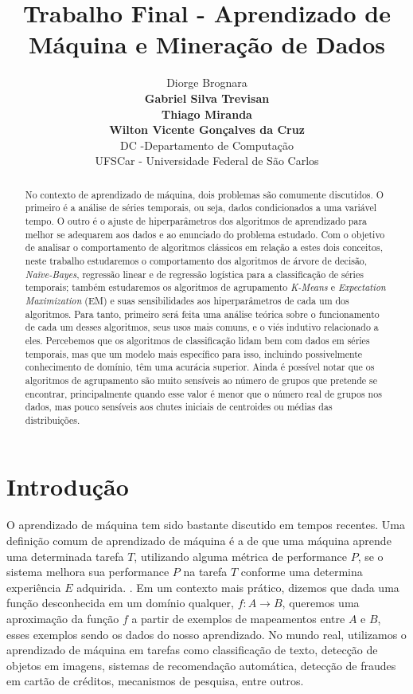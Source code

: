\documentclass{article}
\title{Trabalho Final - Aprendizado de Máquina e Mineração de Dados}
\author{
Diorge Brognara \\
{\bf Gabriel Silva Trevisan}  \\
{\bf Thiago Miranda} \\
{\bf Wilton Vicente Gonçalves da Cruz} \\
DC -Departamento de Computação \\
UFSCar - Universidade Federal de São Carlos \\
}
\begin{document}
\maketitle

\begin{abstract}
No contexto de aprendizado de máquina, dois problemas são comumente discutidos.
O primeiro é a análise de séries temporais, ou seja, dados condicionados a uma variável tempo.
O outro é o ajuste de hiperparâmetros dos algoritmos de aprendizado para melhor se adequarem aos dados e ao enunciado do problema estudado.
Com o objetivo de analisar o comportamento de algoritmos clássicos em relação a estes dois conceitos,
neste trabalho estudaremos o comportamento dos algoritmos de árvore de decisão, {\it Naïve-Bayes},
regressão linear e de regressão logística para a classificação de séries temporais;
também estudaremos os algoritmos de agrupamento {\it K-Means} e {\it Expectation Maximization} (EM)
e suas sensibilidades aos hiperparâmetros de cada um dos algoritmos.
Para tanto, primeiro será feita uma análise teórica sobre o funcionamento de cada um desses algoritmos,
seus usos mais comuns, e o viés indutivo relacionado a eles.
Percebemos que os algoritmos de classificação lidam bem com dados em séries temporais,
mas que um modelo mais específico para isso, incluindo possivelmente conhecimento de domínio, têm uma acurácia superior.
Ainda é possível notar que os algoritmos de agrupamento são muito sensíveis ao número de grupos que pretende se encontrar,
principalmente quando esse valor é menor que o número real de grupos nos dados,
mas pouco sensíveis aos chutes iniciais de centroides ou médias das distribuições.
\end{abstract}

\section{Introdução}

O aprendizado de máquina tem sido bastante discutido em tempos recentes.
Uma definição comum de aprendizado de máquina é a de que uma máquina aprende uma determinada tarefa $T$,
utilizando alguma métrica de performance $P$, se o sistema melhora sua performance $P$ na tarefa $T$ conforme
uma determina experiência $E$ adquirida. \cite{mitchell06}.
Em um contexto mais prático, dizemos que dada uma função desconhecida em um domínio qualquer, $f : A \to B$,
queremos uma aproximação da função $f$ a partir de exemplos de mapeamentos entre $A$ e $B$,
esses exemplos sendo os dados do nosso aprendizado.
No mundo real, utilizamos o aprendizado de máquina em tarefas como classificação de texto,
detecção de objetos em imagens, sistemas de recomendação automática,
detecção de fraudes em cartão de créditos, mecanismos de pesquisa, entre outros.
\end{document}
